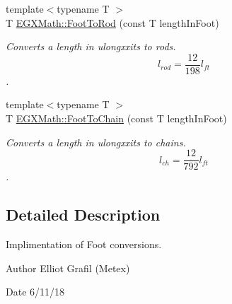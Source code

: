 \begin{DoxyCompactItemize}
{\footnotesize template$<$typename T $>$ }\\T \mbox{\hyperlink{group___e_g_x_math-_conversions-_length_conversions-_imperial-_foot-_surveyors_gace4054ff26544ac7fa6717cec4ce9491}{E\+G\+X\+Math\+::\+Foot\+To\+Rod}} (const T length\+In\+Foot)
\begin{DoxyCompactList}\small\item\em Converts a length in ulongxxits to rods. \[ l_{rod}= \frac{12}{198} l_{ft} \]. \end{DoxyCompactList}\item 
{\footnotesize template$<$typename T $>$ }\\T \mbox{\hyperlink{group___e_g_x_math-_conversions-_length_conversions-_imperial-_foot-_surveyors_ga518f4539e56a49bfc866ec22139752e1}{E\+G\+X\+Math\+::\+Foot\+To\+Chain}} (const T length\+In\+Foot)
\begin{DoxyCompactList}\small\item\em Converts a length in ulongxxits to chains. \[ l_{ch}= \frac{12}{792} l_{ft} \]. \end{DoxyCompactList}\end{DoxyCompactItemize}


\subsection{Detailed Description}
Implimentation of Foot conversions. 

\begin{DoxyAuthor}{Author}
Elliot Grafil (Metex) 
\end{DoxyAuthor}
\begin{DoxyDate}{Date}
6/11/18 
\end{DoxyDate}
